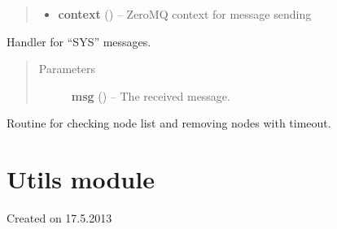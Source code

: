 \documentclass[letterpaper,10pt,english]{sphinxmanual}
\begin{document}
\begin{fulllineitems}
\begin{fulllineitems}
\begin{quote}
\begin{description}
\begin{itemize}
\item {} 
\textbf{context} () -- ZeroMQ context for message sending

\end{itemize}

\end{description}\end{quote}

\end{fulllineitems}


\begin{fulllineitems}
\label{api:swnp.SWNP.sys_handler}
Handler for ``SYS'' messages.
\begin{quote}\begin{description}
\item[{Parameters}] \leavevmode
\textbf{msg} ({\hyperref[api:swnp.Message]{}}) -- The received message.

\end{description}\end{quote}

\end{fulllineitems}


\begin{fulllineitems}
\label{api:swnp.SWNP.timeout_routine}
Routine for checking node list and removing nodes with timeout.

\end{fulllineitems}


\end{fulllineitems}



\section{Utils module}
\label{api:utils-module}\label{api:module-utils}
Created on 17.5.2013
\end{document}
